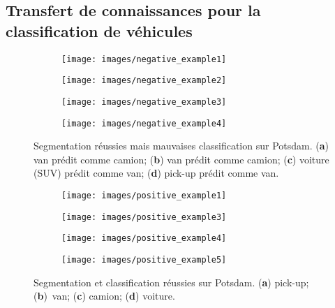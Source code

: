 \subsection{Transfert de connaissances pour la classification de véhicules}
\begin{figure}[t]
\centering
   \begin{subfigure}{0.24\textwidth}
     \texttt{[image: images/negative\_example1]}
     \caption{}
   \end{subfigure}
  \begin{subfigure}{0.24\textwidth}
    \texttt{[image: images/negative\_example2]}
    \caption{}
  \end{subfigure}
  \begin{subfigure}{0.24\textwidth}
    \texttt{[image: images/negative\_example3]}
    \caption{}
  \end{subfigure}
  \begin{subfigure}{0.24\textwidth}
    \texttt{[image: images/negative\_example4]}
    \caption{}
  \end{subfigure}\vspace{-12pt}

  \caption{Segmentation réussies mais mauvaises classification sur Potsdam. (\textbf{a}) van prédit comme camion; (\textbf{b}) van prédit comme camion; (\textbf{c}) voiture (SUV) prédit comme van; (\textbf{d}) pick-up prédit comme van.}
  \label{fig:negative_examples}
\end{figure}
\unskip
\begin{figure}[t]
\centering
  \begin{subfigure}{0.24\textwidth}
    \texttt{[image: images/positive\_example1]}
    \caption{}
  \end{subfigure}
  \begin{subfigure}{0.24\textwidth}
    \texttt{[image: images/positive\_example3]}
    \caption{}
  \end{subfigure}
  \begin{subfigure}{0.24\textwidth}
    \texttt{[image: images/positive\_example4]}
    \caption{}
  \end{subfigure}
  \begin{subfigure}{0.24\textwidth}
    \texttt{[image: images/positive\_example5]}
    \caption{}
  \end{subfigure}\vspace{-12pt}

  \caption{Segmentation et classification réussies sur Potsdam. (\textbf{a}) pick-up; (\textbf{b})~van; (\textbf{c}) camion; (\textbf{d}) voiture.}
  \label{fig:positive_examples}
\end{figure}

